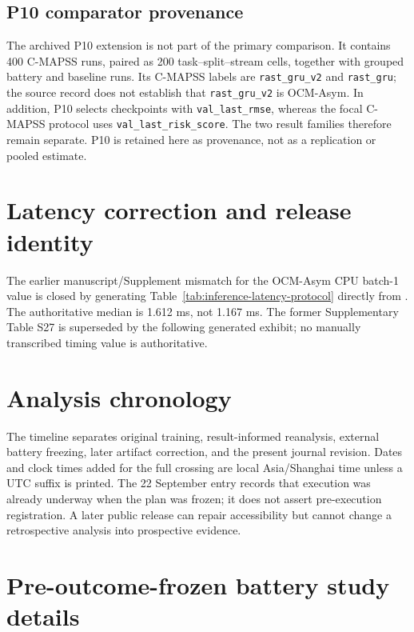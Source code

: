 \documentclass[11pt,a4paper]{article}
\begin{document}
\subsection{P10 comparator provenance}

The archived P10 extension is not part of the primary comparison. It contains 400 C-MAPSS runs, paired as 200 task--split--stream cells, together with grouped battery and baseline runs. Its C-MAPSS labels are \texttt{rast\_gru\_v2} and \texttt{rast\_gru}; the source record does not establish that \texttt{rast\_gru\_v2} is OCM-Asym. In addition, P10 selects checkpoints with \texttt{val\_last\_rmse}, whereas the focal C-MAPSS protocol uses \texttt{val\_last\_risk\_score}. The two result families therefore remain separate. P10 is retained here as provenance, not as a replication or pooled estimate.

\section{Latency correction and release identity}

The earlier manuscript/Supplement mismatch for the OCM-Asym CPU batch-1 value is closed by generating Table~\ref{tab:inference-latency-protocol} directly from . The authoritative median is 1.612 ms, not 1.167 ms. The former Supplementary Table S27 is superseded by the following generated exhibit; no manually transcribed timing value is authoritative.



\section{Analysis chronology}

The timeline separates original training, result-informed reanalysis, external battery freezing, later artifact correction, and the present journal revision. Dates and clock times added for the full crossing are local Asia/Shanghai time unless a UTC suffix is printed. The 22 September entry records that execution was already underway when the plan was frozen; it does not assert pre-execution registration. A later public release can repair accessibility but cannot change a retrospective analysis into prospective evidence.



\section{Pre-outcome-frozen battery study details}
\end{document}
